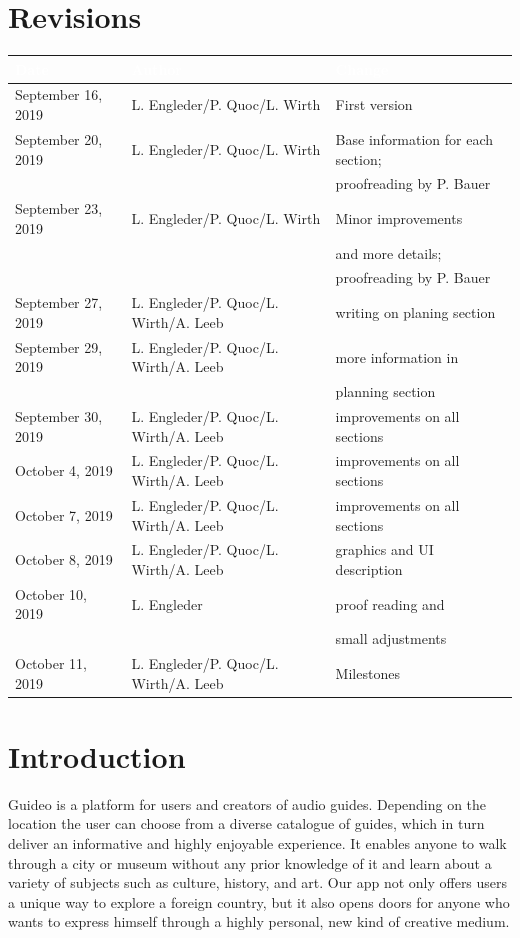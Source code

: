 \documentclass[12pt]{article}
\theoremstyle{definition}
\newenvironment{text}{
}{}
\begin{document}
\section*{Revisions}
\begin{tabular}{|l|l|l|}
\hline
\cellcolor[gray]{0.5}\textcolor{white}{Date} & \cellcolor[gray]{0.5}\textcolor{white}{Author} & \cellcolor[gray]{0.5}\textcolor{white}{Change} \\ \hline
September 16, 2019&L. Engleder/P. Quoc/L. Wirth&First version \\ \hline
September 20, 2019&L. Engleder/P. Quoc/L. Wirth& Base information for each section; \\ && proofreading by P. Bauer \\ \hline
September 23, 2019&L. Engleder/P. Quoc/L. Wirth&Minor improvements \\ && and more details;  \\ && proofreading by P. Bauer \\ \hline
September 27, 2019&L. Engleder/P. Quoc/L. Wirth/A. Leeb&writing on planing section \\ \hline
September 29, 2019&L. Engleder/P. Quoc/L. Wirth/A. Leeb&more information in \\ && planning section \\ \hline
September 30, 2019&L. Engleder/P. Quoc/L. Wirth/A. Leeb& improvements on all sections \\ \hline
October 4, 2019&L. Engleder/P. Quoc/L. Wirth/A. Leeb&improvements on all sections\\ \hline
October 7, 2019&L. Engleder/P. Quoc/L. Wirth/A. Leeb&improvements on all sections\\ \hline
October 8, 2019&L. Engleder/P. Quoc/L. Wirth/A. Leeb&graphics and UI description\\ \hline
October 10, 2019&L. Engleder&proof reading and \\ && small adjustments\\ \hline
October 11, 2019&L. Engleder/P. Quoc/L. Wirth/A. Leeb&Milestones\\ \hline

\end{tabular}
\pagebreak
 
\tableofcontents
\pagebreak
 
\section{Introduction}
\begin{text}
Guideo is a platform for users and creators of audio guides. Depending on the location the user can choose from a diverse catalogue of guides, which in turn deliver an informative and highly enjoyable experience. 
It enables anyone to walk through a city or museum without any prior knowledge of it and learn about a variety of subjects such as culture, history, and art. 
Our app not only offers users a unique way to explore a foreign country, but it also opens doors for anyone who wants to express himself through a highly personal, new kind of creative medium. 
 
\end{text}
\pagebreak
 
\end{document}

